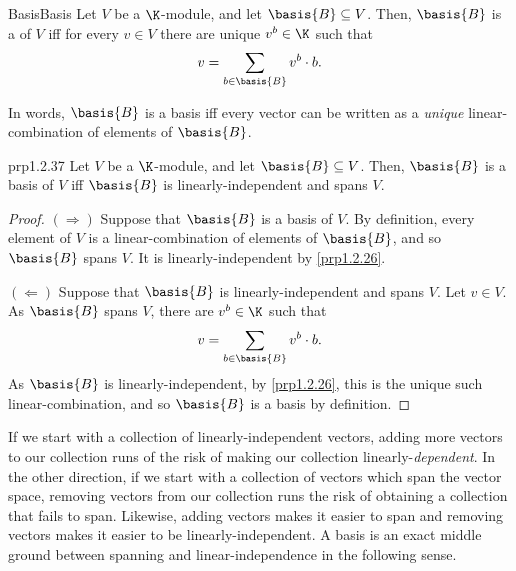 \begin{dfn}{Basis}{Basis}
	Let $V$ be a $\K$-module, and let $\basis{B}\subseteq V$.  Then, $\basis{B}$ is a  of $V$ iff for every $v\in V$ there are unique $v^b\in \K$ such that
	\begin{equation}
	v=\sum _{b\in \basis{B}}v^b\cdot b.
	\end{equation}
	\begin{rmk}
		In words, $\basis{B}$ is a basis iff every vector can be written as a \emph{unique} linear-combination of elements of $\basis{B}$.
	\end{rmk}
\end{dfn}
\begin{prp}{}{prp1.2.37}
	Let $V$ be a $\K$-module, and let $\basis{B}\subseteq V$.  Then, $\basis{B}$ is a basis of $V$ iff $\basis{B}$ is linearly-independent and spans $V$.
	\begin{proof}
		$(\Rightarrow )$ Suppose that $\basis{B}$ is a basis of $V$.  By definition, every element of $V$ is a linear-combination of elements of $\basis{B}$, and so $\basis{B}$ spans $V$.  It is linearly-independent by \cref{prp1.2.26}.
		
		\blni
		$(\Leftarrow )$ Suppose that $\basis{B}$ is linearly-independent and spans $V$.  Let $v\in V$.  As $\basis{B}$ spans $V$, there are $v^b\in \K$ such that
		\begin{equation}
		v=\sum _{b\in \basis{B}}v^b\cdot b.
		\end{equation}
		As $\basis{B}$ is linearly-independent, by \cref{prp1.2.26}, this is the unique such linear-combination, and so $\basis{B}$ is a basis by definition.
	\end{proof}
\end{prp}
If we start with a collection of linearly-independent vectors, adding more vectors to our collection runs of the risk of making our collection linearly-\emph{dependent}.  In the other direction, if we start with a collection of vectors which span the vector space, removing vectors from our collection runs the risk of obtaining a collection that fails to span.  Likewise, adding vectors makes it easier to span and removing vectors makes it easier to be linearly-independent.  A basis is an exact middle ground between spanning and linear-independence in the following sense.
